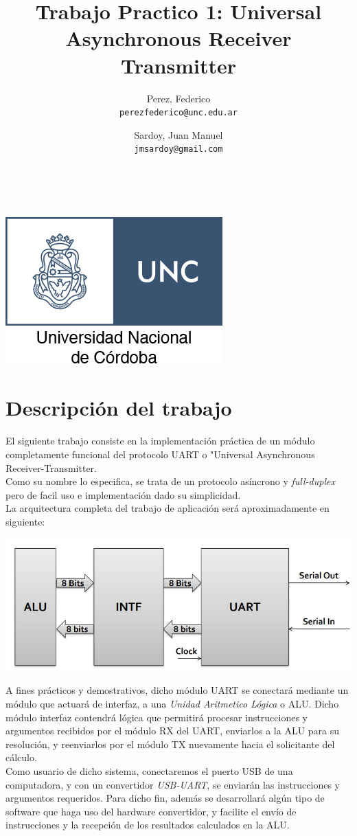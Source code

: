 \documentclass{article}
\title{Trabajo Practico 1: Universal Asynchronous Receiver Transmitter}
\author{Perez, Federico\\
        \texttt{perezfederico@unc.edu.ar}
        \and 
        Sardoy, Juan Manuel\\
        \texttt{jmsardoy@gmail.com}
        }
\begin{document}
\maketitle
\\
\begin{center}
    \includegraphics[scale=2]{unc-logo}
\end{center}
\newpage
\section{Descripción del trabajo}

El siguiente trabajo consiste en la implementación práctica de un módulo completamente
funcional del protocolo UART o "Universal Asynchronous Receiver-Transmitter. \\
Como su nombre lo especifica, se trata de un protocolo asíncrono y \textit{full-duplex}
pero de facil uso e implementación dado su simplicidad.\\
La arquitectura completa del trabajo de aplicación será aproximadamente en siguiente:

\begin{center}
    \includegraphics[scale=0.5]{arch}
\end{center}

\indent A fines prácticos y demostrativos, dicho módulo UART se conectará mediante un 
módulo que actuará de interfaz, a una \textit{Unidad Aritmetico Lógica} o ALU.
Dicho módulo interfaz contendrá lógica que permitirá procesar instrucciones y argumentos recibidos
por el módulo RX del UART, enviarlos a la ALU para su resolución, y reenviarlos por el módulo TX 
nuevamente hacia el solicitante del cálculo. \\
\indent Como usuario de dicho sistema, conectaremos el puerto USB de una computadora, y con un convertidor
\textit{USB-UART}, se enviarán las instrucciones y argumentos requeridos. Para dicho fin, además se 
desarrollará algún tipo de software que haga uso del hardware convertidor, y facilite el envío de instrucciones
y la recepción de los resultados calculados en la ALU.\\ 
\end{document}
